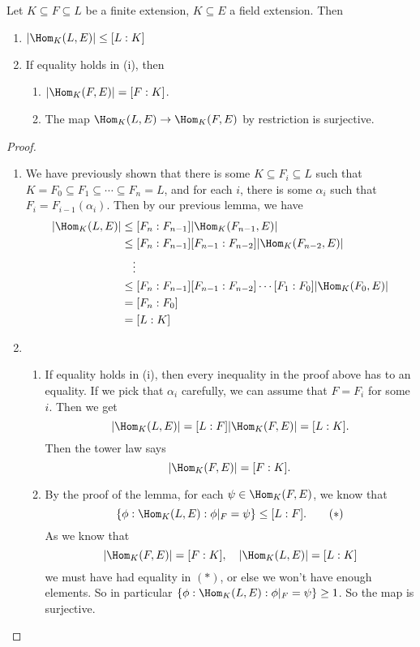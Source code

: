 \documentclass[a4paper]{article}
\begin{document}
\begin{thm}[]
  Let $K\subseteq F\subseteq L$ be a finite extension, $K\subseteq E$ a field extension. Then
  \begin{enumerate}
    \item $|\Hom_K(L, E)| \leq [L:K]$
    \item If equality holds in (i), then
      \begin{enumerate}
        \item $|\Hom_K(F, E)| = [F:K]$.
        \item The map $\Hom_K(L, E) \to \Hom_K(F, E)$ by restriction is surjective.
      \end{enumerate}
  \end{enumerate}
\end{thm}

\begin{proof}\leavevmode
  \begin{enumerate}
    \item We have previously shown that there is some $K\subseteq F_i \subseteq L$ such that $K = F_0 \subseteq F_1 \subseteq\cdots \subseteq F_n = L$, and for each $i$, there is some $\alpha_i$ such that $F_i = F_{i - 1}(\alpha_i)$. Then by our previous lemma, we have
      \begin{align*}
        |\Hom_K(L, E)| &\leq [F_n:F_{n - 1}] |\Hom_K(F_{n - 1}, E)|\\
        &\leq [F_n: F_{n - 1}][F_{n - 1}: F_{n - 2}] |\Hom_K(F_{n - 2}, E)|\\
        &\quad \vdots\\
        &\leq [F_n:F_{n - 1}][F_{n - 1}:F_{n - 2}] \cdots [F_1:F_0] |\Hom_K(F_0, E)|\\
        &= [F_n:F_0]\\
        &= [L:K]
      \end{align*}
    \item
    \begin{enumerate}
      \item If equality holds in (i), then every inequality in the proof above has to an equality. If we pick that $\alpha_i$ carefully, we can assume that $F = F_i$ for some $i$. Then we get
        \[
          |\Hom_K(L, E)| = [L:F] |\Hom_K(F, E)| = [L:K].
        \]
        Then the tower law says
        \[
          |\Hom_K(F, E)| = [F:K].
        \]
      \item By the proof of the lemma, for each $\psi \in \Hom_K(F, E)$, we know that
        \[
          \{\phi: \Hom_K(L, E): \phi|_F = \psi\} \leq [L:F].\tag{$*$}
        \]
        As we know that
        \[
          |\Hom_K(F, E)| = [F:K],\quad |\Hom_K(L, E)| = [L:K]
        \]
        we must have had equality in $(*)$, or else we won't have enough elements. So in particular $\{\phi: \Hom_K(L, E): \phi|_F = \psi\} \geq 1$. So the map is surjective.
    \end{enumerate}
  \end{enumerate}
\end{proof}
\end{document}
